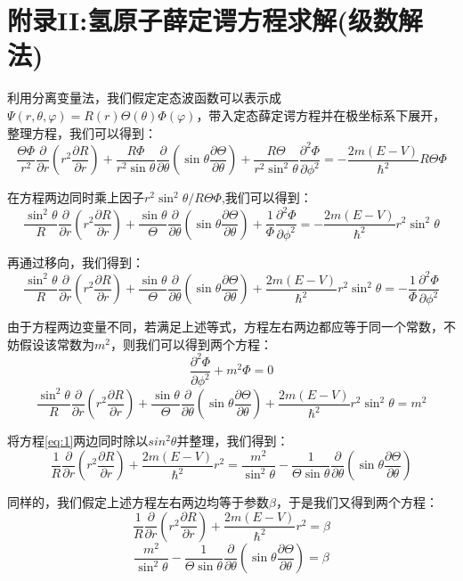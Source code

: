 \section{附录II:氢原子薛定谔方程求解(级数解法)\label{hydrgen}}
利用分离变量法，我们假定定态波函数可以表示成$\varPsi(r,\theta,\varphi)=R(r)\Theta(\theta)\varPhi(\varphi)$，带入定态薛定谔方程并在极坐标系下展开，整理方程，我们可以得到：
\[\frac{\Theta\varPhi}{r^2}\frac{\partial}{\partial{r}}(r^2\frac{\partial R}{\partial{r}})+\frac{R\varPhi}{r^2\sin\theta}\frac{\partial}{\partial{\theta}}(\sin\theta\frac{\partial \Theta}{\partial{\theta}})+\frac{R\Theta}{r^2\sin^2 \theta }\frac{\partial^2 \varPhi}{\partial{\phi^2}}=-\frac{2m(E-V)}{\hbar^2}R\Theta\varPhi\]

在方程两边同时乘上因子$r^2\sin^2 \theta/R\Theta\varPhi$,我们可以得到：
\[\frac{\sin^2 \theta}{R}\frac{\partial}{\partial{r}}(r^2\frac{\partial R}{\partial{r}})+\frac{\sin\theta}{\Theta}\frac{\partial}{\partial{\theta}}(\sin\theta\frac{\partial \Theta}{\partial{\theta}})+\frac{1}{\varPhi}\frac{\partial^2 \varPhi}{\partial{\phi^2}}=-\frac{2m(E-V)}{\hbar^2}r^2\sin^2 \theta\]

再通过移向，我们得到：
\[\frac{\sin^2 \theta}{R}\frac{\partial}{\partial{r}}(r^2\frac{\partial R}{\partial{r}})+\frac{\sin\theta}{\Theta}\frac{\partial}{\partial{\theta}}(\sin\theta\frac{\partial \Theta}{\partial{\theta}})+\frac{2m(E-V)}{\hbar^2}r^2\sin^2 \theta=-\frac{1}{\varPhi}\frac{\partial^2 \varPhi}{\partial{\phi^2}}\]

由于方程两边变量不同，若满足上述等式，方程左右两边都应等于同一个常数，不妨假设该常数为$m^2$，则我们可以得到两个方程：
\[\frac{\partial^2 \varPhi}{\partial{\phi^2}}+m^2\varPhi=0 \tag{a}\label{eq:a}\]
\[\frac{\sin^2 \theta}{R}\frac{\partial}{\partial{r}}(r^2\frac{\partial R}{\partial{r}})+\frac{\sin\theta}{\Theta}\frac{\partial}{\partial{\theta}}(\sin\theta\frac{\partial \Theta}{\partial{\theta}})+\frac{2m(E-V)}{\hbar^2}r^2\sin^2 \theta=m^2 \tag{1}\label{eq:1}\]

将方程\ref{eq:1}两边同时除以$sin^2 \theta$并整理，我们得到：
\[\frac{1}{R}\frac{\partial}{\partial{r}}(r^2\frac{\partial R}{\partial{r}})+\frac{2m(E-V)}{\hbar^2}r^2=\frac{m^2}{\sin^2 \theta}-\frac{1}{\Theta \sin\theta}\frac{\partial}{\partial{\theta}}(\sin\theta\frac{\partial \Theta}{\partial{\theta}})\]

同样的，我们假定上述方程左右两边均等于参数$\beta$，于是我们又得到两个方程：
\[\frac{1}{R}\frac{\partial}{\partial{r}}(r^2\frac{\partial R}{\partial{r}})+\frac{2m(E-V)}{\hbar^2}r^2=\beta \tag{b}\label{eq:b}\]
\[\frac{m^2}{\sin^2 \theta}-\frac{1}{\Theta \sin\theta}\frac{\partial}{\partial{\theta}}(\sin\theta\frac{\partial \Theta}{\partial{\theta}})=\beta \tag{c}\label{eq:c}\]

